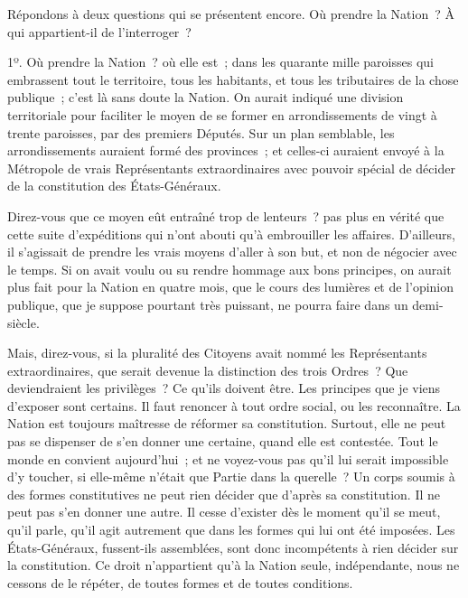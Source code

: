 \documentclass[french,twoside]{book} %
\begin{document}
Répondons à deux questions qui se présentent encore. Où prendre la Nation ? À qui appartient-il de l’interroger ?\par
1º. Où prendre la Nation ? où elle est ; dans les quarante mille paroisses qui embrassent tout le territoire, tous les habitants, et tous les tributaires de la chose publique ; c’est là sans doute la Nation. On aurait indiqué une division territoriale pour faciliter le moyen de se former en arrondissements de vingt à trente paroisses, par des premiers Députés. Sur un plan semblable, les arrondissements auraient formé des provinces ; et celles-ci auraient envoyé à la Métropole de vrais Représentants extraordinaires avec pouvoir spécial de décider de la constitution des États-Généraux.\par
Direz-vous que ce moyen eût entraîné trop de lenteurs ? pas plus en vérité que cette suite d’expéditions qui n’ont abouti qu’à embrouiller les affaires. D’ailleurs, il s’agissait de prendre les vrais moyens d’aller à son but, et non de négocier avec le temps. Si on avait voulu ou su rendre hommage aux bons principes, on aurait plus fait pour la Nation en quatre mois, que le cours des lumières et de l’opinion publique, que je suppose pourtant très puissant, ne pourra faire dans un demi-siècle.\par
Mais, direz-vous, si la pluralité des Citoyens avait nommé les Représentants extraordinaires, que serait devenue la distinction des trois Ordres ? Que deviendraient les privilèges ? Ce qu’ils doivent être. Les principes que je viens d’exposer sont certains. Il faut renoncer à tout ordre social, ou les reconnaître. La Nation est toujours maîtresse de réformer sa constitution. Surtout, elle ne peut pas se dispenser de s’en donner une certaine, quand elle est contestée. Tout le monde en convient aujourd’hui ; et ne voyez-vous pas qu’il lui serait impossible d’y toucher, si elle-même n’était que Partie dans la querelle ? Un corps soumis à des formes constitutives ne peut rien décider que d’après sa constitution. Il ne peut pas s’en donner une autre. Il cesse d’exister dès le moment qu’il se meut, qu’il parle, qu’il agit autrement que dans les formes qui lui ont été imposées. Les États-Généraux, fussent-ils assemblées, sont donc incompétents à rien décider sur la constitution. Ce droit n’appartient qu’à la Nation seule, indépendante, nous ne cessons de le répéter, de toutes formes et de toutes conditions.\par
\end{document}
